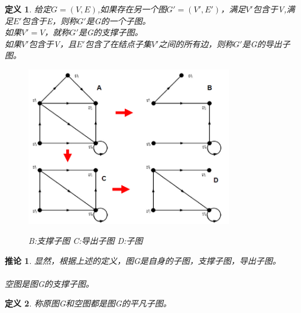 \documentclass[11pt,a4paper,openany]{book}
\newtheorem{defination}{\textbf{定义}}[section]
\newtheorem{coro}{\textbf{推论}}[section]
\begin{document}
\begin{defination}
给定$G=(V,E)$,如果存在另一个图$G'=(V',E')$，满足$V'$包含于V,满足$E'$包含于E，则称$G'$是G的一个\textcolor[rgb]{1.00,0.00,0.00}{子图}。\\
如果$V'=V$，就称$G'$是G的\textcolor[rgb]{1.00,0.00,0.00}{支撑子图}。\\
如果$V'$包含于V，且$E'$包含了在结点子集$V'$之间的所有边，则称$G'$是G的\textcolor[rgb]{1.00,0.00,0.00}{导出子图}。\\
\begin{figure}[H]
  \centering
  \includegraphics[width=0.8\textwidth]{1.5.png}\\
  \caption{B:支撑子图 C:导出子图 D:子图}
\end{figure}
\end{defination}
\begin{coro}
显然，根据上述的定义，图G是自身的子图，支撑子图，导出子图。\\
\\
空图是图G的支撑子图。\\
\end{coro}
\begin{defination}
称原图G和空图都是图G的\textcolor[rgb]{1.00,0.00,0.00}{平凡子图}。\\
\end{defination}
\end{document}
